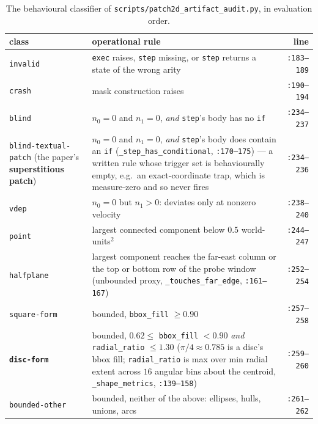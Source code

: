 \begin{table}[htbp]
\centering
\footnotesize
\caption{The behavioural classifier of
\texttt{scripts/\allowbreak patch2d\_\allowbreak artifact\_\allowbreak audit.\allowbreak py}, in evaluation order.}
\label{tab:proto-classes}
\begin{tabular}{p{}p{}r}
\toprule
class & operational rule & line \\
\midrule
\texttt{invalid} & \texttt{exec} raises, \texttt{step} missing, or
  \texttt{step} returns a state of the wrong arity & \texttt{:183--189} \\
\texttt{crash} & mask construction raises & \texttt{:190--194} \\
\texttt{blind} & $n_0 = 0$ and $n_1 = 0$, \emph{and} \texttt{step}'s body has no
  \texttt{if} & \texttt{:234--237} \\
\texttt{blind-\allowbreak textual-\allowbreak patch} (the paper's \textbf{superstitious patch}) &
  $n_0 = 0$ and $n_1 = 0$, \emph{and} \texttt{step}'s body does contain an
  \texttt{if} (\texttt{\_\allowbreak step\_\allowbreak has\_\allowbreak conditional}, \texttt{:170--175}) --- a
  written rule whose trigger set is behaviourally empty, e.g.\ an
  exact-coordinate trap, which is measure-zero and so never fires &
  \texttt{:234--236} \\
\texttt{vdep} & $n_0 = 0$ but $n_1 > 0$: deviates only at nonzero velocity &
  \texttt{:238--240} \\
\texttt{point} & largest connected component below $0.5$ world-units$^2$ &
  \texttt{:244--247} \\
\texttt{halfplane} & largest component reaches the far-east column or the top or
  bottom row of the probe window (unbounded proxy,
  \texttt{\_\allowbreak touches\_\allowbreak far\_\allowbreak edge}, \texttt{:161--167}) & \texttt{:252--254} \\
\texttt{square-form} & bounded, \texttt{bbox\_fill} $\geq 0.90$ &
  \texttt{:257--258} \\
\textbf{\texttt{disc-form}} & bounded, $0.62 \leq$ \texttt{bbox\_fill} $< 0.90$
  \emph{and} \texttt{radial\_ratio} $\leq 1.30$ ($\pi/4 \approx 0.785$ is a
  disc's bbox fill; \texttt{radial\_ratio} is max over min radial extent across
  $16$ angular bins about the centroid, \texttt{\_\allowbreak shape\_\allowbreak metrics},
  \texttt{:139--158}) & \texttt{:259--260} \\
\texttt{bounded-other} & bounded, neither of the above: ellipses, hulls, unions,
  arcs & \texttt{:261--262} \\
\bottomrule
\end{tabular}
\end{table}


